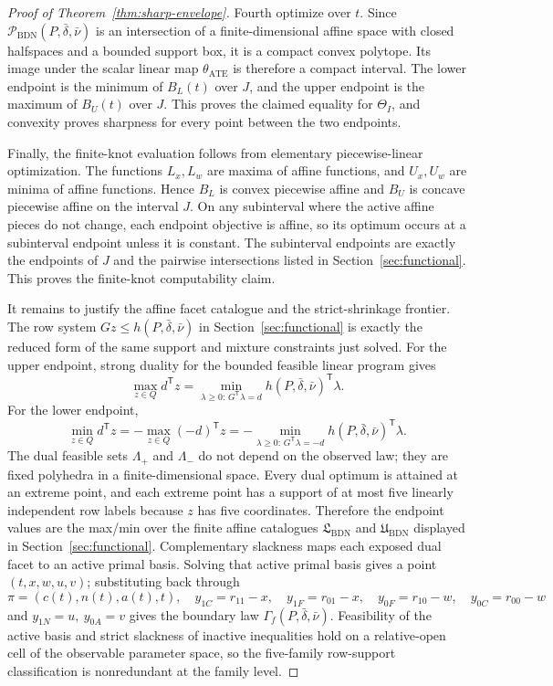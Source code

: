 \documentclass[11pt]{article}
\newcommand{\transpose}{\mathsf{T}}
\theoremstyle{definition}
\theoremstyle{plain}
\theoremstyle{remark}
\begin{document}
\begin{proof}[Proof of Theorem~\ref{thm:sharp-envelope}]
Fourth optimize over \(t\).  Since
\(\mathcal{P}_{\mathrm{BDN}}(P,\bar\delta,\bar\nu)\) is an intersection of a
finite-dimensional affine space with closed halfspaces and a bounded support
box, it is a compact convex polytope.  Its image under the scalar linear map
\(\theta_{\mathrm{ATE}}\) is therefore a compact interval.  The lower endpoint
is the minimum of \(B_L(t)\) over \(J\), and the upper endpoint is the maximum
of \(B_U(t)\) over \(J\).  This proves the claimed equality for
\(\Theta_I\), and convexity proves sharpness for every point between the two
endpoints.

Finally, the finite-knot evaluation follows from elementary piecewise-linear
optimization.  The functions \(L_x,L_w\) are maxima of affine functions, and
\(U_x,U_w\) are minima of affine functions.  Hence \(B_L\) is convex
piecewise affine and \(B_U\) is concave piecewise affine on the interval \(J\).
On any subinterval where the active affine pieces do not change, each endpoint
objective is affine, so its optimum occurs at a subinterval endpoint unless it
is constant.  The subinterval endpoints are exactly the endpoints of \(J\) and
the pairwise intersections listed in Section~\ref{sec:functional}.  This proves
the finite-knot computability claim.

It remains to justify the affine facet catalogue and the strict-shrinkage
frontier.  The row system \(Gz\le h(P,\bar\delta,\bar\nu)\) in
Section~\ref{sec:functional} is exactly the reduced form of the same support
and mixture constraints just solved.  For the upper endpoint, strong duality
for the bounded feasible linear program gives
\[
\max_{z\in Q}d^{\transpose}z
=\min_{\lambda\ge0:\,G^{\transpose}\lambda=d}
h(P,\bar\delta,\bar\nu)^{\transpose}\lambda .
\]
For the lower endpoint,
\[
\min_{z\in Q}d^{\transpose}z
=-\max_{z\in Q}(-d)^{\transpose}z
=-\min_{\lambda\ge0:\,G^{\transpose}\lambda=-d}
h(P,\bar\delta,\bar\nu)^{\transpose}\lambda .
\]
The dual feasible sets \(\Lambda_+\) and \(\Lambda_-\) do not depend on the
observed law; they are fixed polyhedra in a finite-dimensional space.  Every
dual optimum is attained at an extreme point, and each extreme point has a
support of at most five linearly independent row labels because \(z\) has five
coordinates.  Therefore the endpoint values are the max/min over the finite
affine catalogues \(\mathfrak{L}_{\mathrm{BDN}}\) and
\(\mathfrak{U}_{\mathrm{BDN}}\) displayed in Section~\ref{sec:functional}.
Complementary slackness maps each exposed dual facet to an active primal
basis.  Solving that active primal basis gives a point
\((t,x,w,u,v)\); substituting back through
\[
\pi=(c(t),n(t),a(t),t),\quad
y_{1C}=r_{11}-x,\quad y_{1F}=r_{01}-x,\quad
y_{0F}=r_{10}-w,\quad y_{0C}=r_{00}-w
\]
and \(y_{1N}=u,\ y_{0A}=v\) gives the boundary law
\(\Gamma_f(P,\bar\delta,\bar\nu)\).  Feasibility of the active basis and
strict slackness of inactive inequalities hold on a relative-open cell of the
observable parameter space, so the five-family row-support classification is
nonredundant at the family level.


\end{proof}
\end{document}

